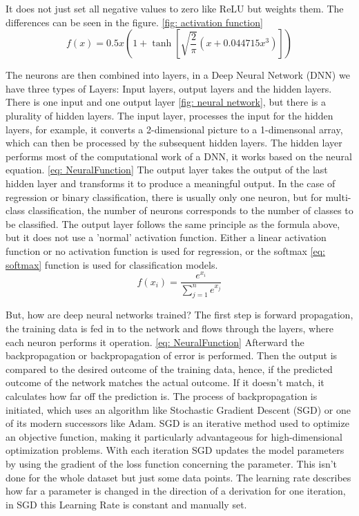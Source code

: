 It does not just set all negative values to zero like ReLU but weights them.
The differences can be seen in the figure. \ref{fig: activation function}
\begin{equation}
    f(x) = 0.5x\left ( 1+\tanh\left [ \sqrt{\frac{2}{\pi}}\left ( x+0.044715x^3 \right ) \right ] \right )
    \label{eq: gelu}
\end{equation}

The neurons are then combined into layers, in a Deep Neural Network (DNN) we have three types of Layers:
Input layers, output layers and the hidden layers.
There is one input and one output layer \ref{fig: neural network}, but there is a plurality of hidden layers.
The input layer, processes the input for the hidden layers, for example, it converts a 2-dimensional picture to a 1-dimensonal array, which can then be processed by the subsequent hidden layers.
The hidden layer performs most of the computational work of a DNN, it works based on the neural equation. \ref{eq: NeuralFunction}
The output layer takes the output of the last hidden layer and transforms it to produce a meaningful output.
In the case of regression or binary classification, there is usually only one neuron, but for multi-class classification, the number of neurons corresponds to the number of classes to be classified.
The output layer follows the same principle as the formula above, but it does not use a 'normal' activation function.
Either a linear activation function or no activation function is used for regression, or the softmax \ref{eq: softmax} function is used for classification models.
\begin{equation}
    f(x_i) = \frac{e^{x_i}}{\sum^n_{j=1}e^{x_j}}
    \label{eq: softmax}
\end{equation}

But, how are deep neural networks trained? \cite{lecun_deep_2015}
The first step is forward propagation, the training data is fed in to the network and flows through the layers, where each neuron performs it operation. \ref{eq: NeuralFunction}
Afterward the backpropagation or backpropagation of error is performed. \cite{rumelhart_learning_1986}
Then the output is compared to the desired outcome of the training data, hence, if the predicted outcome of the network matches the actual outcome.
If it doesn't match, it calculates how far off the prediction is.
The process of backpropagation is initiated, which uses an algorithm like Stochastic Gradient Descent (SGD) or one of its modern successors like Adam.
SGD is an iterative method used to optimize an objective function, making it particularly advantageous for high-dimensional optimization problems.
With each iteration SGD updates the model parameters by using the gradient of the loss function concerning the parameter.
This isn't done for the whole dataset but just some data points.
The learning rate describes how far a parameter is changed in the direction of a derivation for one iteration, in SGD this Learning Rate is constant and manually set.

